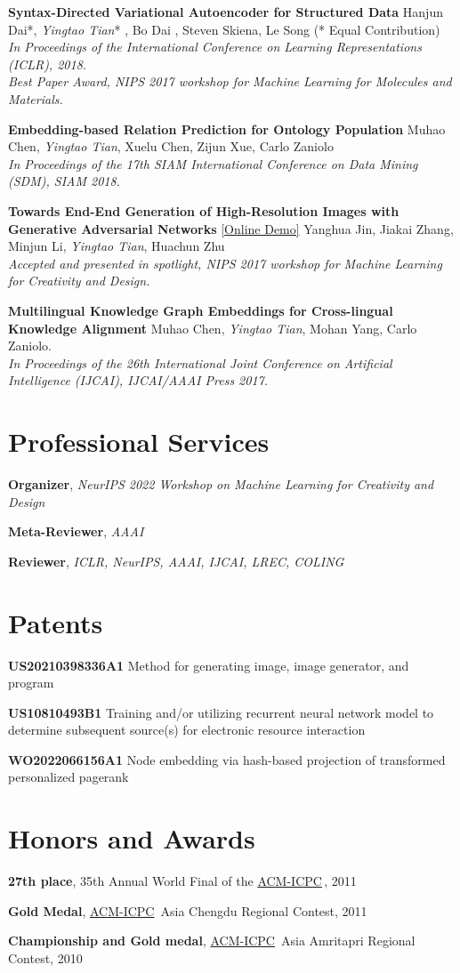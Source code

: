\documentclass[line,margin]{cv}
\newcommand{\myemph}{\textbf}
\newcommand{\ICPC}{\href{http://icpc.baylor.edu/}{ACM-ICPC}}
\begin{document}
\begin{resume}
  {\bf Syntax-Directed Variational Autoencoder for Structured Data}
  Hanjun Dai*, \emph{Yingtao Tian}* , Bo Dai , Steven Skiena, Le Song (* Equal Contribution)\\
  \emph{In Proceedings of the International Conference on Learning Representations (ICLR), 2018. \\
  Best Paper Award, NIPS 2017 workshop for Machine Learning for Molecules and Materials.}
  
	{\bf Embedding-based Relation Prediction for Ontology Population}
	Muhao Chen, \emph{Yingtao Tian}, Xuelu Chen, Zijun Xue, Carlo Zaniolo\\
	\emph{In Proceedings of the 17th SIAM International Conference on Data Mining (SDM), SIAM 2018.}

  {\bf Towards End-End Generation of High-Resolution Images with Generative Adversarial Networks}
  \href{http://make.girls.moe/#/}{[Online Demo]}
  Yanghua Jin, Jiakai Zhang, Minjun Li, \emph{Yingtao Tian}, Huachun Zhu\\
  \emph{Accepted and presented in spotlight, NIPS 2017 workshop for Machine Learning for Creativity and Design.}

  {\bf Multilingual Knowledge Graph Embeddings for Cross-lingual Knowledge Alignment}
  Muhao Chen, \emph{Yingtao Tian}, Mohan Yang, Carlo Zaniolo.\\
  \emph{In Proceedings of the 26th International Joint Conference on Artificial Intelligence (IJCAI), IJCAI/AAAI Press 2017.}

\section{Professional Services }
  \myemph{Organizer}, \emph{NeurIPS 2022 Workshop on Machine Learning for Creativity and Design}

  \myemph{Meta-Reviewer}, \emph{AAAI}

  \myemph{Reviewer}, \emph{ICLR, NeurIPS, AAAI, IJCAI, LREC, COLING}

\section{Patents}

  \myemph{US20210398336A1} Method for generating image, image generator, and program

  \myemph{US10810493B1} Training and/or utilizing recurrent neural network model to determine subsequent source(s) for electronic resource interaction
  
  \myemph{WO2022066156A1} Node embedding via hash-based projection of transformed personalized pagerank
  

\section{Honors and Awards}
	\myemph{27th place}, 35th Annual World Final of the \ICPC \,, 2011

	\myemph{Gold Medal}, \ICPC\ Asia Chengdu Regional Contest, 2011

	\myemph{Championship and Gold medal}, \ICPC\ Asia Amritapri Regional Contest, 2010

\end{resume}
\end{document}

